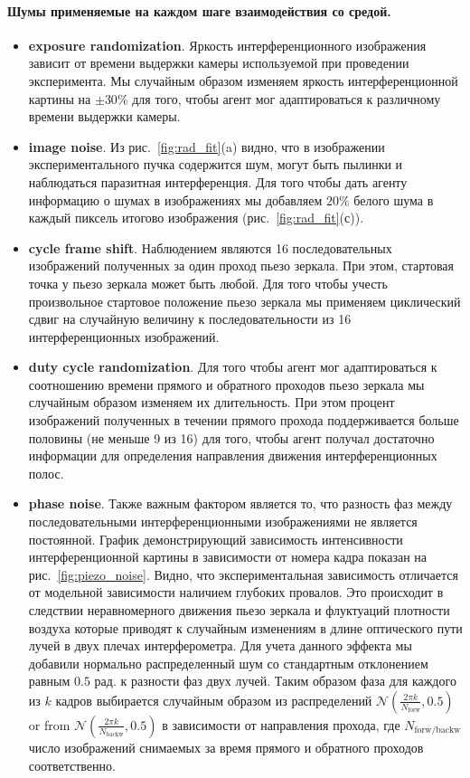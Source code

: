 \paragraph{Шумы применяемые на каждом шаге взаимодействия со средой.}
\begin{itemize}
    \item \textbf{exposure randomization}. Яркость интерференционного изображения зависит от времени выдержки камеры используемой при проведении эксперимента. Мы случайным образом изменяем яркость интерференционной картины на $\pm 30\%$ для того, чтобы агент мог адаптироваться к различному времени выдержки камеры.
    \item  \textbf{image noise}. Из рис.~\ref{fig:rad_fit}(a) видно, что в изображении экспериментального пучка содержится шум, могут быть пылинки и наблюдаться паразитная интерференция. Для того чтобы дать агенту информацию о шумах в изображениях мы добавляем $20\%$ белого шума в каждый пиксель итогово изображения (рис.~\ref{fig:rad_fit}(с)). 
    \item \textbf{cycle frame shift}. Наблюдением являются 16 последовательных изображений полученных за один проход пьезо зеркала. При этом, стартовая точка у пьезо зеркала может быть любой. Для того чтобы учесть произвольное стартовое положение пьезо зеркала мы применяем циклический сдвиг на случайную величину к последовательности из 16 интерференционных изображений. 
    \item \textbf{duty cycle randomization}. Для того чтобы агент мог адаптироваться к соотношению времени прямого и обратного проходов пьезо зеркала мы случайным образом изменяем их длительность. При этом процент изображений полученных в течении прямого прохода поддерживается больше половины (не меньше 9 из 16) для того, чтобы агент получал достаточно информации для определения направления движения интерференционных полос.  
    \item \textbf{phase noise}. Также важным фактором является то, что разность фаз между последовательными интерференционными изображениями не является постоянной. График демонстрирующий зависимость интенсивности интерференционной картины в зависимости от номера кадра показан на рис.~\ref{fig:piezo_noise}. Видно, что экспериментальная зависимость отличается от модельной зависимости наличием глубоких провалов. Это происходит в следствии неравномерного движения пьезо зеркала и флуктуаций плотности воздуха которые приводят к случайным изменениям в длине оптического пути лучей в двух плечах интерферометра. Для учета данного эффекта мы добавили нормально распределенный шум со стандартным отклонением равным $0.5$ рад. к разности фаз двух лучей. Таким образом фаза для каждого из $k$ кадров выбирается случайным образом из распределений $\mathcal{N}(\frac{2\pi k}{N_{\mathrm{forw}}}, 0.5)$ or from $\mathcal{N}(\frac{2\pi k}{N_{\mathrm{backw}}}, 0.5)$ в зависимости от направления прохода, где $N_{\mathrm{forw/backw}}$ число изображений снимаемых за время прямого и обратного проходов соответственно.
\end{itemize}

